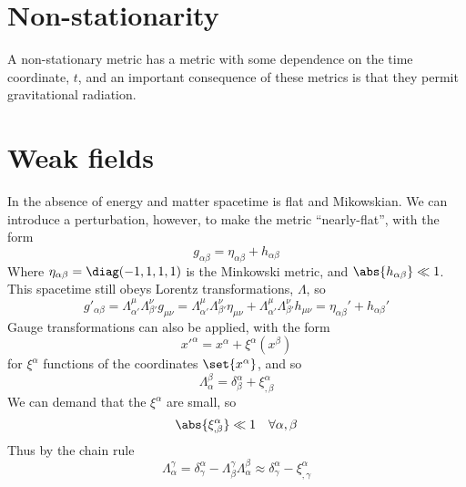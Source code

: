 
\section{Non-stationarity}
\label{sec:non-stationarity}

A non-stationary metric has a metric with some dependence on the time
coordinate, $t$, and an important consequence of these metrics is that
they permit gravitational radiation.

\section{Weak fields}
\label{sec:weak-fields}

In the absence of energy and matter spacetime is flat and
Mikowskian. We can introduce a perturbation, however, to make the
metric ``nearly-flat'', with the form
\begin{equation}
  \label{eq:229}
  g_{\alpha \beta} = \eta_{\alpha \beta} + h_{\alpha \beta}
\end{equation}
Where $\eta_{\alpha \beta} = \diag(-1,1,1,1)$ is the Minkowski metric,
and $\abs{h_{\alpha \beta}} \ll 1$. This spacetime still obeys Lorentz
transformations, $\Lambda$, so
\begin{equation}
  \label{eq:1}
  g'_{\alpha \beta} = \Lambda_{\alpha'}^{\mu} \Lambda_{\beta'}^{\nu} g_{\mu \nu} =  \Lambda_{\alpha'}^{\mu} \Lambda_{\beta'}^{\nu} \eta_{\mu \nu} +  \Lambda_{\alpha'}^{\mu} \Lambda_{\beta'}^{\nu} h_{\mu \nu} = \eta_{\alpha \beta}' + h_{\alpha \beta}'
\end{equation} 
Gauge transformations can also be applied, with the form
\begin{equation}
  \label{eq:2}
  x'^{\alpha} = x^{\alpha} + \xi^{\alpha}(x^{\beta})
\end{equation}
for $\xi^{\alpha}$ functions of the coordinates $\set{x^{\alpha}}$, and so
\begin{equation}
  \label{eq:3}
  \Lambda_{\alpha}^{\beta} = \delta^{\alpha}_{\beta} + \xi_{,\beta}^{\alpha}
\end{equation}
We can demand that the $\xi^{\alpha}$ are small, so
\[ \abs{\xi^{\alpha}_{,\beta}} \ll 1 \quad \forall \alpha,\beta\]
Thus by the chain rule
\begin{equation}
  \label{eq:5}
  \Lambda_{\alpha}^{\gamma} = \delta^{\alpha}_{\gamma} - \Lambda^{\gamma}_{\beta} \Lambda^{\beta}_{\alpha} \approx \delta^{\alpha}_{\gamma} - \xi_{,\gamma}^{\alpha} 
\end{equation}

